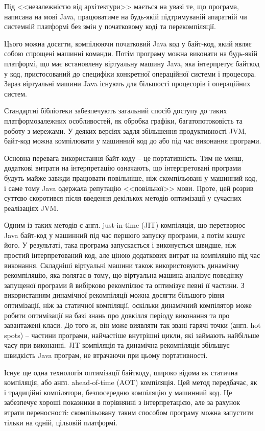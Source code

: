 \par Під <<незалежністю від архітектури>> мається на увазі те, що програма, написана на мові Java, працюватиме на будь-якій підтримуваній апаратній чи системній платформі без змін у початковому коді та перекомпіляції.
\par Цього можна досягти, компілюючи початковий Java код у байт-код, який являє собою спрощені машинні команди. Потім програму можна виконати на будь-якій платформі, що має встановлену віртуальну машину Java, яка інтерпретує байткод у код, пристосований до специфіки конкретної операційної системи і процесора. Зараз віртуальні машини Java існують для більшості процесорів і операційних систем.
\par Стандартні бібліотеки забезпечують загальний спосіб доступу до таких платформозалежних особливостей, як обробка графіки, багатопотоковість та роботу з мережами. У деяких версіях задля збільшення продуктивності JVM, байт-код можна компілювати у машинний код до або під час виконання програми.
\par Основна перевага використання байт-коду -- це портативність. Тим не менш, додаткові витрати на інтерпретацію означають, що інтерпретовані програми будуть майже завжди працювати повільніше, ніж скомпільовані у машинний код, і саме тому Java одержала репутацію <<повільної>> мови. Проте, цей розрив суттєво скоротився після введення декількох методів оптимізації у сучасних реалізаціях JVM.
\par Одним із таких методів є англ. just-in-time (JIT) компіляція, що перетворює Java байт-код у машинний під час першого запуску програми, а потім кешує його. У результаті, така програма запускається і виконується швидше, ніж простий інтерпретований код, але ціною додаткових витрат на компіляцію під час виконання. Складніші віртуальні машини також використовують динамічну рекомпіляцію, яка полягає в тому, що віртуальна машина аналізує поведінку запущеної програми й вибірково рекомпілює та оптимізує певні її частини. З використанням динамічної рекомпіляції можна досягти більшого рівня оптимізації, ніж за статичної компіляції, оскільки динамічний компілятор може робити оптимізації на базі знань про довкілля періоду виконання та про завантажені класи. До того ж, він може виявляти так звані гарячі точки (англ. hot spots) -- частини програми, найчастіше внутрішні цикли, які займають найбільше часу при виконанні. JIT компіляція та динамічна рекомпіляція збільшує швидкість Java програм, не втрачаючи при цьому портативності.
\par Існує ще одна технологія оптимізації байткоду, широко відома як статична компіляція, або англ. ahead-of-time (AOT) компіляція. Цей метод передбачає, як і традиційні компілятори, безпосередню компіляцію у машинний код. Це забезпечує хороші показники в порівнянні з інтерпретацією, але за рахунок втрати переносності: скомпільовану таким способом програму можна запустити тільки на одній, цільовій платформі.
